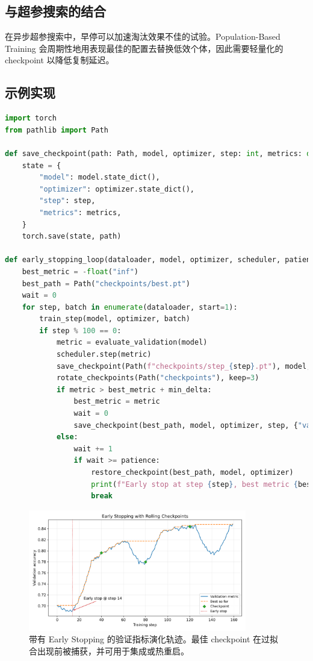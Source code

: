\documentclass[UTF8,zihao=-4]{ctexart}
\begin{document}
\subsection{与超参搜索的结合}
在异步超参搜索中，早停可以加速淘汰效果不佳的试验。Population-Based Training 会周期性地用表现最佳的配置去替换低效个体，因此需要轻量化的 checkpoint 以降低复制延迟。

\subsection{示例实现}

\begin{lstlisting}[language=Python, caption={PyTorch 环境下的 Early Stopping 与 Checkpoint 轮换。}]
import torch
from pathlib import Path

def save_checkpoint(path: Path, model, optimizer, step: int, metrics: dict):
    state = {
        "model": model.state_dict(),
        "optimizer": optimizer.state_dict(),
        "step": step,
        "metrics": metrics,
    }
    torch.save(state, path)

def early_stopping_loop(dataloader, model, optimizer, scheduler, patience=10, min_delta=1e-4):
    best_metric = -float("inf")
    best_path = Path("checkpoints/best.pt")
    wait = 0
    for step, batch in enumerate(dataloader, start=1):
        train_step(model, optimizer, batch)
        if step % 100 == 0:
            metric = evaluate_validation(model)
            scheduler.step(metric)
            save_checkpoint(Path(f"checkpoints/step_{step}.pt"), model, optimizer, step, {"val": metric})
            rotate_checkpoints(Path("checkpoints"), keep=3)
            if metric > best_metric + min_delta:
                best_metric = metric
                wait = 0
                save_checkpoint(best_path, model, optimizer, step, {"val": metric})
            else:
                wait += 1
                if wait >= patience:
                    restore_checkpoint(best_path, model, optimizer)
                    print(f"Early stop at step {step}, best metric {best_metric:.4f}")
                    break
\end{lstlisting}

\begin{figure}[H]
  \centering
  \includegraphics[width=0.85\textwidth]{early_stopping_checkpoint.png}
  \caption{带有 Early Stopping 的验证指标演化轨迹。最佳 checkpoint 在过拟合出现前被捕获，并可用于集成或热重启。}
  \label{fig:early_stopping_checkpoint_cn}
\end{figure}
\FloatBarrier
\end{document}
